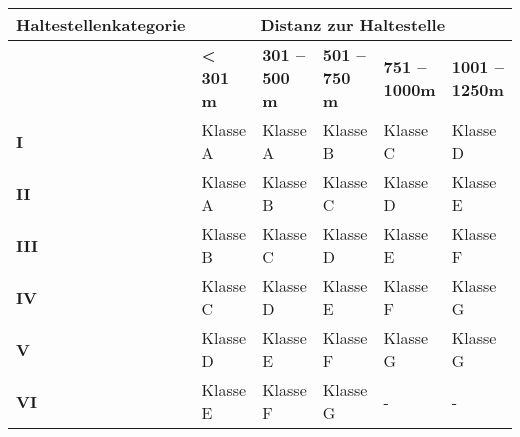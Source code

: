 \begin{table}[ht]
    \begin{tabular}[c]{l p{2.0cm} p{2.0cm} p{2.0cm} p{2.0cm} p{2.0cm}}
        \toprule
        \textbf{Haltestellenkategorie}
                                & \multicolumn{5}{c}{\textbf{Distanz zur Haltestelle}}\\
        \midrule
        \textbf{}
                                & \textbf{< 301 m}
                                & \textbf{301 -- 500 m}
                                & \textbf{501 -- 750 m}
                                & \textbf{751 -- 1000m}
                                & \textbf{1001 -- 1250m}\\
        \textbf{I}
                                & Klasse A
                                & Klasse A
                                & Klasse B
                                & Klasse C
                                & \cellcolor{red!25}Klasse D\\
        \textbf{II}
                                & Klasse A
                                & Klasse B
                                & Klasse C
                                & Klasse D
                                & \cellcolor{red!25}Klasse E\\
        \textbf{III}
                                & Klasse B
                                & Klasse C
                                & Klasse D
                                & \cellcolor{red!25}Klasse E
                                & \cellcolor{red!25}Klasse F\\
        \textbf{IV}
                                & Klasse C
                                & Klasse D
                                & \cellcolor{red!25}Klasse E
                                & \cellcolor{red!25}Klasse F
                                & \cellcolor{red!25}Klasse G\\
        \textbf{V}
                                & Klasse D
                                & \cellcolor{red!25}Klasse E
                                & \cellcolor{red!25}Klasse F
                                & \cellcolor{red!25}Klasse G
                                & \cellcolor{red!25}Klasse G\\
        \cellcolor{red!25}\textbf{VI}
                                & \cellcolor{red!25}Klasse E
                                & \cellcolor{red!25}Klasse F
                                & \cellcolor{red!25}Klasse G
                                & -
                                & -\\

\end{tabular}
\end{table}
